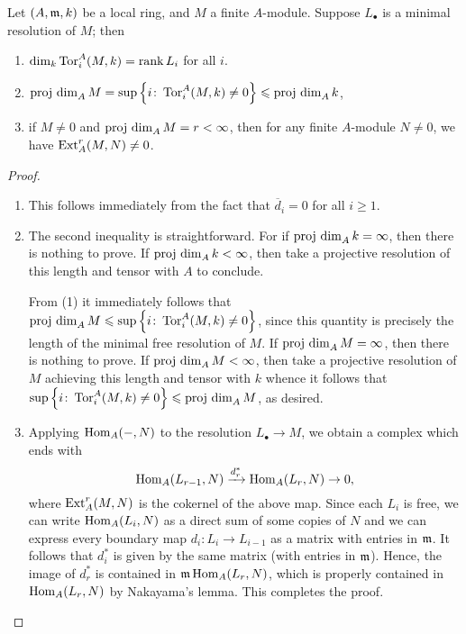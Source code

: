 \begin{lemma}
    Let $(A,\mathfrak{m}, k)$ be a local ring, and $M$ a finite $A$-module. Suppose $L_\bullet$ is a minimal resolution of $M$; then 
    \begin{enumerate}[label=(\arabic*)]
        \item $\dim_k\operatorname{Tor}^A_i(M, k) = \operatorname{rank} L_i$ for all $i$.
        \item $\operatorname{proj~dim}_A M = \sup\left\{i\colon\operatorname{Tor}^A_i(M, k)\ne 0\right\}\leqslant\operatorname{proj~dim}_A k$, 
        \item if $M\ne 0$ and $\operatorname{proj~dim}_A M = r < \infty$, then for any finite $A$-module $N\ne 0$, we have $\operatorname{Ext}^r_A(M, N)\ne 0$.
    \end{enumerate}
\end{lemma}
\begin{proof}
\begin{enumerate}[label=(\arabic*)]
    \item This follows immediately from the fact that $\overline d_i = 0$ for all $i\ge 1$.
    \item The second inequality is straightforward. For if $\operatorname{proj~dim}_A k = \infty$, then there is nothing to prove. If $\operatorname{proj~dim}_A k < \infty$, then take a projective resolution of this length and tensor with $A$ to conclude.
    
    From (1) it immediately follows that $\operatorname{proj~dim}_A M\leqslant\sup\left\{i\colon \operatorname{Tor}^A_i(M, k)\ne 0\right\}$, since this quantity is precisely the length of the minimal free resolution of $M$. If $\operatorname{proj~dim}_A M = \infty$, then there is nothing to prove. If $\operatorname{proj~dim}_A M < \infty$, then take a projective resolution of $M$ achieving this length and tensor with $k$ whence it follows that $\sup\left\{i\colon\operatorname{Tor}^A_i(M, k)\ne 0\right\}\leqslant\operatorname{proj~dim}_A M$, as desired.

    \item Applying $\operatorname{Hom}_A(-, N)$ to the resolution $L_\bullet\to M$, we obtain a complex which ends with 
    \begin{equation*}
        \operatorname{Hom}_A(L_{r - 1}, N)\xrightarrow{d_r^\ast}\operatorname{Hom}_A(L_r, N)\to 0,
    \end{equation*}
    where $\operatorname{Ext}^r_A(M, N)$ is the cokernel of the above map. Since each $L_i$ is free, we can write $\operatorname{Hom}_A(L_i, N)$ as a direct sum of some copies of $N$ and we can express every boundary map $d_i: L_i\to L_{i - 1}$ as a matrix with entries in $\mathfrak{m}$. It follows that $d_i^\ast$ is given by the same matrix (with entries in $\mathfrak{m}$). Hence, the image of $d_r^\ast$ is contained in $\mathfrak{m}\operatorname{Hom}_A(L_r, N)$, which is properly contained in $\operatorname{Hom}_A(L_r, N)$ by Nakayama's lemma. This completes the proof.\qedhere
\end{enumerate}
\end{proof}

